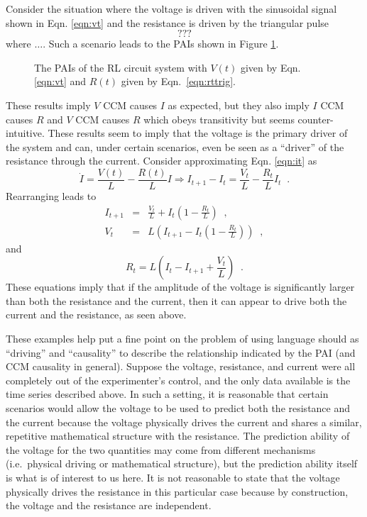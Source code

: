 \documentclass[a4paper,11pt]{article}
\begin{document}
Consider the situation where the voltage is driven with the sinusoidal signal shown in Eqn. \ref{eqn:vt} and the resistance is driven by the triangular pulse 
\begin{equation}
\label{eqn:rttrig}
???
\end{equation}
where $\ldots$.  Such a scenario leads to the PAIs shown in Figure \ref{fig:}.
\begin{figure}[ht]
\label{fig:}
\caption{The PAIs of the RL circuit system with $V(t)$ given by Eqn. \ref{eqn:vt} and $R(t)$ given by Eqn.\ \ref{eqn:rttrig}.}
\end{figure}
These results imply $V$ CCM causes $I$ as expected, but they also imply $I$ CCM causes $R$ and $V$ CCM causes $R$ which obeys transitivity but seems counter-intuitive.  These results seem to imply that the voltage is the primary driver of the system and can, under certain scenarios, even be seen as a ``driver'' of the resistance through the current.  Consider approximating Eqn. \ref{eqn:it} as
\begin{equation}
\dot{I} = \frac{V(t)}{L} - \frac{R(t)}{L} I\Rightarrow I_{t+1}-I_t = \frac{V_t}{L} - \frac{R_t}{L} I_t\;\;.
\end{equation}
Rearranging leads to
\begin{eqnarray}
I_{t+1} &=& \frac{V_t}{L}+I_t\left(1-\frac{R_t}{L}\right)\;\;,\\
V_t &=& L\left(I_{t+1}-I_t\left(1-\frac{R_t}{L}\right)\right)\;\;,
\end{eqnarray}
and
\begin{equation}
R_t = L\left(I_t-I_{t+1}+\frac{V_t}{L}\right)\;\;.
\end{equation}
These equations imply that if the amplitude of the voltage is significantly larger than both the resistance and the current, then it can appear to drive both the current and the resistance, as seen above.

These examples help put a fine point on the problem of using language should as ``driving'' and ``causality'' to describe the relationship indicated by the PAI (and CCM causality in general).  Suppose the voltage, resistance, and current were all completely out of the experimenter's control, and the only data available is the time series described above.  In such a setting, it is reasonable that certain scenarios would allow the voltage to be used to predict both the resistance and the current because the voltage physically drives the current and shares a similar, repetitive mathematical structure with the resistance.  The prediction ability of the voltage for the two quantities may come from different mechanisms (i.e.\ physical driving or mathematical structure), but the prediction ability itself is what is of interest to us here.  It is not reasonable to state that the voltage physically drives the resistance in this particular case because by construction, the voltage and the resistance are independent.  
\end{document}
